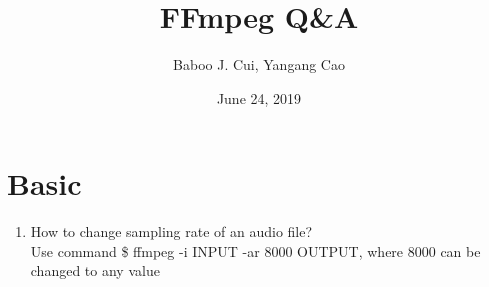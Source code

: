 \documentclass[10pt,a4paper,oneside]{article}
\date{June 24, 2019}
\author{Baboo J. Cui, Yangang Cao}
\title{FFmpeg Q\&A}
\begin{document}
\maketitle
\tableofcontents

\newpage
\section{Basic}
\begin{enumerate}[1.]
\item How to change sampling rate of an audio file?\\
Use command \$ ffmpeg -i INPUT -ar 8000 OUTPUT, where 8000 can be changed to any value
\end{enumerate}
\end{document}

